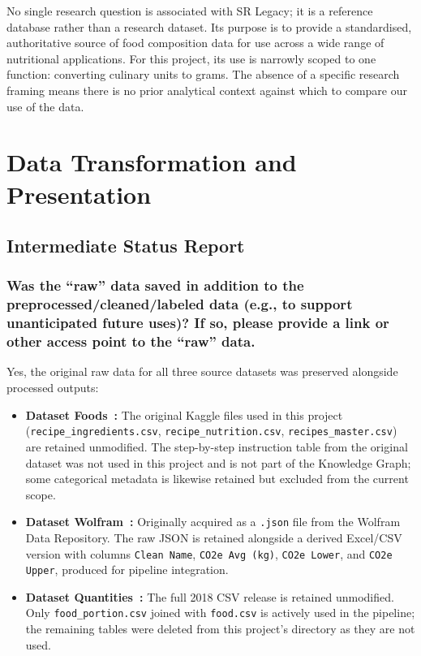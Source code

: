 \documentclass{article}
\newcommand{\question}[1]{#1}
\begin{document}
No single research question is associated with SR Legacy; it is a reference database rather than a research dataset. Its purpose is to provide a standardised, authoritative source of food composition data for use across a wide range of nutritional applications. For this project, its use is narrowly scoped to one function: converting culinary units to grams. The absence of a specific research framing means there is no prior analytical context against which to compare our use of the data.




\section{Data Transformation and Presentation}

\subsection*{Intermediate Status Report}

\question{\subsubsection*{Was the ``raw'' data saved in addition to the preprocessed/cleaned/labeled data (e.g., to support unanticipated future uses)? If so, please provide a link or other access point to the ``raw'' data.}}

Yes, the original raw data for all three source datasets was preserved alongside processed outputs:

\begin{itemize}
    \item \textbf{Dataset Foods~\cite{kaggle_southasian}:} The original Kaggle files used in this project (\texttt{recipe\_ingredients.csv}, \texttt{recipe\_nutrition.csv}, \texttt{recipes\_master.csv}) are retained unmodified. The step-by-step instruction table from the original dataset was not used in this project and is not part of the Knowledge Graph; some categorical metadata is likewise retained but excluded from the current scope.
    \item \textbf{Dataset Wolfram~\cite{wolfram_carbon}:} Originally acquired as a \texttt{.json} file from the Wolfram Data Repository. The raw JSON is retained alongside a derived Excel/CSV version with columns \texttt{Clean Name}, \texttt{CO2e Avg (kg)}, \texttt{CO2e Lower}, and \texttt{CO2e Upper}, produced for pipeline integration.
    \item \textbf{Dataset Quantities~\cite{usda_srlegacy}:} The full 2018 CSV release is retained unmodified. Only \texttt{food\_portion.csv} joined with \texttt{food.csv} is actively used in the pipeline; the remaining tables were deleted from this project's directory as they are not used.
\end{itemize}
\end{document}

